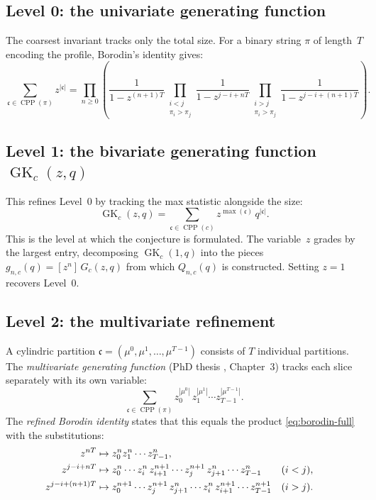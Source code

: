 \documentclass[11pt]{article}
\theoremstyle{plain}
\theoremstyle{definition}
\newcommand{\GK}{\operatorname{GK}}
\newcommand{\CPP}{\operatorname{CPP}}
\begin{document}
\subsection{Level 0: the univariate generating function}

The coarsest invariant tracks only the total size.  For a binary string
$\pi$ of length~$T$ encoding the profile, Borodin's identity
\cite{Borodin} gives:
\begin{equation}
  \sum_{\mathfrak{c} \in \CPP(\pi)} z^{|\mathfrak{c}|}
  = \prod_{n \geq 0} \left(
    \frac{1}{1 - z^{(n+1)T}}
    \prod_{\substack{i < j \\ \pi_i > \pi_j}} \frac{1}{1 - z^{j-i+nT}}
    \prod_{\substack{i > j \\ \pi_i > \pi_j}} \frac{1}{1 - z^{j-i+(n+1)T}}
  \right).
  \label{eq:borodin-full}
\end{equation}

\subsection{Level 1: the bivariate generating function $\GK_c(z,q)$}

This refines Level~0 by tracking the max statistic alongside the size:
\[
  \GK_c(z,q) = \sum_{\mathfrak{c} \in \CPP(c)}
  z^{\max(\mathfrak{c})}\, q^{|\mathfrak{c}|}.
\]
This is the level at which the conjecture is formulated.
The variable~$z$ grades by the largest entry, decomposing $\GK_c(1,q)$
into the pieces $g_{n,c}(q) = [z^n]\,G_c(z,q)$ from which $Q_{n,c}(q)$ is
constructed.  Setting $z = 1$ recovers Level~0.


\subsection{Level 2: the multivariate refinement}

A cylindric partition $\mathfrak{c} = (\mu^0, \mu^1, \ldots, \mu^{T-1})$
consists of $T$ individual partitions.  The \emph{multivariate generating
function} (PhD thesis \cite{Langer-thesis}, Chapter~3) tracks each slice
separately with its own variable:
\begin{equation}
  \sum_{\mathfrak{c} \in \CPP(\pi)}
  z_0^{|\mu^0|}\, z_1^{|\mu^1|} \cdots z_{T-1}^{|\mu^{T-1}|}.
  \label{eq:multivariate-gf}
\end{equation}
The \emph{refined Borodin identity} states that this equals the product
\eqref{eq:borodin-full} with the substitutions:
\begin{align}
  z^{nT} &\mapsto z_0^n z_1^n \cdots z_{T-1}^n, \notag \\
  z^{j-i+nT} &\mapsto z_0^n \cdots z_i^n\, z_{i+1}^{n+1} \cdots
    z_j^{n+1}\, z_{j+1}^n \cdots z_{T-1}^n
    && (i < j), \label{eq:refined-sub} \\
  z^{j-i+(n+1)T} &\mapsto z_0^{n+1} \cdots z_j^{n+1}\, z_{j+1}^n \cdots
    z_i^n\, z_{i+1}^{n+1} \cdots z_{T-1}^{n+1}
    && (i > j). \notag
\end{align}
\end{document}
